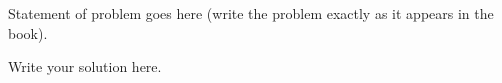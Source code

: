 \begin{problem}{5} 
    Statement of problem goes here (write the problem exactly as it appears in the book).
\end{problem}



\begin{sol}
    Write your solution here.
\end{sol}